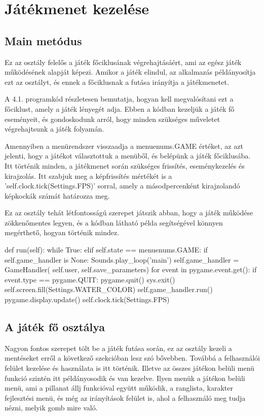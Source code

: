 \section{Játékmenet kezelése}

\subsection{Main metódus}
\indent \indent Ez az osztály felelős a játék főciklusának végrehajtásáért, ami az egész játék működésének alapját képezi. Amikor a játék elindul, az alkalmazás példányosítja ezt az osztályt, és ennek a főciklusnak a futása irányítja a játékmenetet.

A 4.1. programkód részletesen bemutatja, hogyan kell megvalósítani ezt a főciklust, amely a játék lényegét adja. Ebben a kódban kezeljük a játék fő eseményeit, és gondoskodunk arról, hogy minden szükséges műveletet végrehajtsunk a játék folyamán.

Amennyiben a menürendszer visszaadja a menuenums.GAME értéket, az azt jelenti, hogy a játékot választottuk a menüből, és belépünk a játék főciklusába. Itt történik minden, a játékmenet során szükséges frissítés, eseménykezelés és kirajzolás. Itt szabjuk meg a képfrissítés mértékét is a 'self.clock.tick(Settings.FPS)' sorral, amely a másodpercenként kirajzolandó képkockák számát határozza meg.

Ez az osztály tehát létfontosságú szerepet játszik abban, hogy a játék működése zökkenőmentes legyen, és a kódban látható példa segítségével könnyen megérthető, hogyan történik mindez.


\begin{python}[caption={Játék főciklusa \cite{main-loop}},label=py:főciklus]
    def run(self):
        while True:
            elif self.state == menuenums.GAME:
                if self.game_handler is None:
                    Sounds.play_loop('main')
                    self.game_handler = GameHandler(
                        self.user, self.save_parameters)
                for event in pygame.event.get():
                    if event.type == pygame.QUIT:
                        pygame.quit()
                        sys.exit()
                self.screen.fill(Settings.WATER_COLOR)
                self.game_handler.run()
                pygame.display.update()
                self.clock.tick(Settings.FPS)
\end{python}

\subsection{A játék fő osztálya}
\indent \indent Nagyon fontos szerepet tölt be a játék futása során, ez az osztály kezeli a mentéseket erről a következő szekcióban lesz szó bővebben. 
Továbbá a felhasználói felület kezelése és használata is itt történik. Illetve az összes játékon belüli menü funkció szintén itt példányosodik és van kezelve. Ilyen menük a játékon belüli menü, ami a pillanat állj funkcióval együtt működik, a ranglista, karakter fejlesztési menü, és még az irányítások felület is, ahol a felhasználó meg tudja nézni, melyik gomb mire való.


